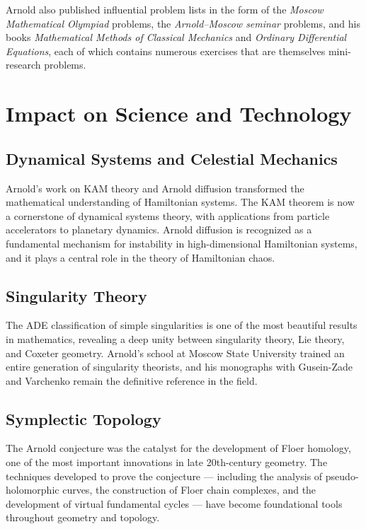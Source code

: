Arnold also published influential problem lists in the form of the \emph{Moscow Mathematical Olympiad} problems, the \emph{Arnold--Moscow seminar} problems, and his books \textit{Mathematical Methods of Classical Mechanics} and \textit{Ordinary Differential Equations}, each of which contains numerous exercises that are themselves mini-research problems.

\section{Impact on Science and Technology}

\subsection{Dynamical Systems and Celestial Mechanics}

Arnold's work on KAM theory and Arnold diffusion transformed the mathematical understanding of Hamiltonian systems. The KAM theorem is now a cornerstone of dynamical systems theory, with applications from particle accelerators to planetary dynamics. Arnold diffusion is recognized as a fundamental mechanism for instability in high-dimensional Hamiltonian systems, and it plays a central role in the theory of Hamiltonian chaos.

\subsection{Singularity Theory}

The ADE classification of simple singularities is one of the most beautiful results in mathematics, revealing a deep unity between singularity theory, Lie theory, and Coxeter geometry. Arnold's school at Moscow State University trained an entire generation of singularity theorists, and his monographs with Gusein-Zade and Varchenko remain the definitive reference in the field.

\subsection{Symplectic Topology}

The Arnold conjecture was the catalyst for the development of Floer homology, one of the most important innovations in late 20th-century geometry. The techniques developed to prove the conjecture --- including the analysis of pseudo-holomorphic curves, the construction of Floer chain complexes, and the development of virtual fundamental cycles --- have become foundational tools throughout geometry and topology.

